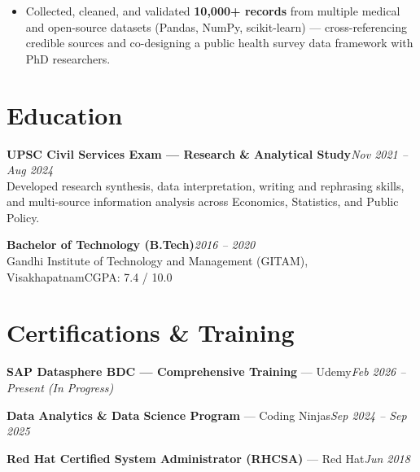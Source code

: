 \documentclass[10pt, letterpaper]{article}
\begin{document}
\begin{itemize}
  \item Collected, cleaned, and validated \textbf{10,000+ records} from multiple medical and open-source datasets (Pandas, NumPy, scikit-learn) — cross-referencing credible sources and co-designing a public health survey data framework with PhD researchers.
\end{itemize}

\section{Education}

{\bfseries UPSC Civil Services Exam — Research \& Analytical Study}\hfill{\small\color{muted}\textit{Nov 2021 – Aug 2024}}\\
{\small\color{muted}Developed research synthesis, data interpretation, writing and rephrasing skills, and multi-source information analysis across Economics, Statistics, and Public Policy.}

\vspace{2pt}
{\bfseries Bachelor of Technology (B.Tech)}\hfill{\small\color{muted}\textit{2016 – 2020}}\\
{\small\color{muted}Gandhi Institute of Technology and Management (GITAM), Visakhapatnam\hfill CGPA: 7.4 / 10.0}

\section{Certifications \& Training}

{\bfseries SAP Datasphere BDC — Comprehensive Training} — Udemy\hfill{\small\color{muted}\textit{Feb 2026 – Present \emph{(In Progress)}}}

\vspace{1pt}
{\bfseries Data Analytics \& Data Science Program} — Coding Ninjas\hfill{\small\color{muted}\textit{Sep 2024 – Sep 2025}}

\vspace{1pt}
{\bfseries Red Hat Certified System Administrator (RHCSA)} — Red Hat\hfill{\small\color{muted}\textit{Jun 2018}}

\end{document}
